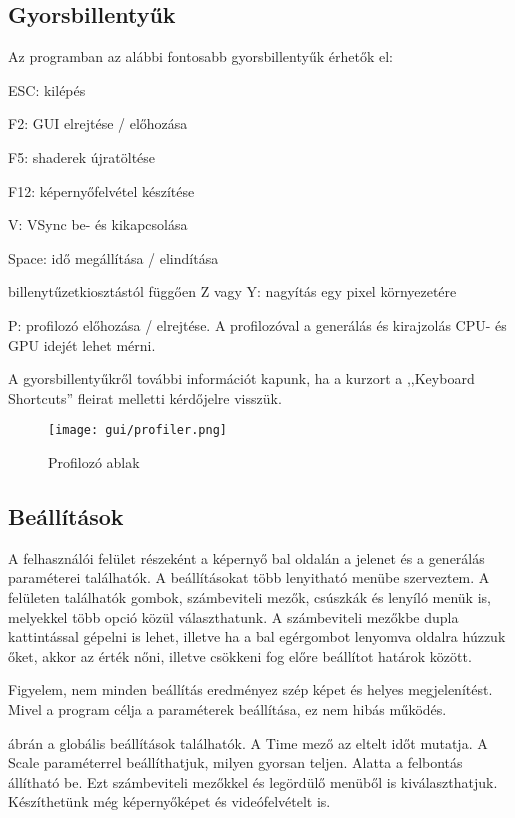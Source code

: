 \subsection{Gyorsbillentyűk}
Az programban az alábbi fontosabb gyorsbillentyűk érhetők el:
\begin{compactenum}
	\item ESC: kilépés
	\item F2: GUI elrejtése / előhozása
	\item F5: shaderek újratöltése
	\item F12: képernyőfelvétel készítése
	\item V: VSync be- és kikapcsolása 
	\item Space: idő megállítása / elindítása
	\item billenytűzetkiosztástól függően Z vagy Y: nagyítás egy pixel környezetére
	\item P: profilozó előhozása / elrejtése. A profilozóval a generálás és kirajzolás CPU- és GPU idejét lehet mérni. 
\end{compactenum}
A gyorsbillentyűkről további információt kapunk, ha a kurzort a ,,Keyboard Shortcuts'' fleirat melletti kérdőjelre visszük. 
\begin{figure}[H]
	\centering
	\texttt{[image: gui/profiler.png]}
	\caption{Profilozó ablak}
	\label{fig:profilerp}
\end{figure}

\subsection{Beállítások}

A felhasználói felület részeként a képernyő bal oldalán a jelenet és a generálás paraméterei találhatók. A beállításokat több lenyitható menübe szerveztem. A felületen találhatók gombok, számbeviteli mezők, csúszkák és lenyíló menük is, melyekkel több opció közül választhatunk. A számbeviteli mezőkbe dupla kattintással gépelni is lehet, illetve ha a bal egérgombot lenyomva oldalra húzzuk őket, akkor az érték nőni, illetve csökkeni fog előre beállítot határok között.

Figyelem, nem minden beállítás eredményez szép képet és helyes megjelenítést. Mivel a program célja a paraméterek beállítása, ez nem hibás működés.

 ábrán a globális beállítások találhatók. A Time mező az eltelt időt mutatja. A Scale paraméterrel beállíthatjuk, milyen gyorsan teljen. Alatta a felbontás állítható be. Ezt számbeviteli mezőkkel és legördülő menüből is kiválaszthatjuk. Készíthetünk még képernyőképet és videófelvételt is.

